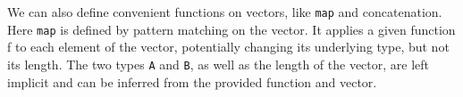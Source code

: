 We can also define convenient functions on vectors, like \texttt{map} and concatenation.
Here \texttt{map} is defined by pattern matching on the vector. It applies a given function f to each element
of the vector, potentially changing its underlying type, but not its length.
The two types \texttt{A} and \texttt{B}, as well as the length of the vector, are left implicit and can
be inferred from the provided function and vector.
\begin{code}%
\>[0]\AgdaSpace{}%
\AgdaSymbol{:}\AgdaSpace{}%
\AgdaSymbol{\{}\AgdaSpace{}%
\AgdaSpace{}%
\AgdaSymbol{:}\AgdaSpace{}%
\AgdaSymbol{\}\{}\AgdaSpace{}%
\AgdaSymbol{:}\AgdaSpace{}%
\AgdaSymbol{\}}\AgdaSpace{}%
\AgdaSpace{}%
\AgdaSymbol{(}\AgdaSpace{}%
\AgdaSpace{}%
\AgdaSymbol{)}\AgdaSpace{}%
\AgdaSpace{}%
\AgdaSpace{}%
\AgdaSpace{}%
\AgdaSpace{}%
\AgdaSpace{}%
\AgdaSpace{}%
\AgdaSpace{}%
\<%
\\
\>[0]\AgdaSpace{}%
\AgdaSymbol{\AgdaUnderscore{}}\AgdaSpace{}%
\AgdaInductiveConstructor{[]}\AgdaSpace{}%
\AgdaSymbol{=}\AgdaSpace{}%
\AgdaInductiveConstructor{[]}\<%
\\
\>[0]\AgdaSpace{}%
\AgdaSpace{}%
\AgdaSymbol{(}\AgdaSpace{}%
\AgdaOperator{\AgdaInductiveConstructor{::}}\AgdaSpace{}%
\AgdaSymbol{)}\AgdaSpace{}%
\AgdaSymbol{=}\AgdaSpace{}%
\AgdaSymbol{(}\AgdaSpace{}%
\AgdaSymbol{)}\AgdaSpace{}%
\AgdaOperator{\AgdaInductiveConstructor{::}}\AgdaSpace{}%
\AgdaSymbol{(}\AgdaSpace{}%
\AgdaSpace{}%
\AgdaSymbol{)}\<%
\end{code}

